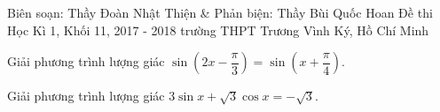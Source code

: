 \begin{name}
	{Biên soạn: Thầy Đoàn Nhật Thiện \& Phản biện: Thầy Bùi Quốc Hoan}
	{Đề thi Học Kì 1, Khối 11, 2017 - 2018 trường THPT Trương Vình Ký, Hồ Chí Minh}
\end{name}
\begin{bt}%
	Giải phương trình lượng giác $\sin \left( 2x-\dfrac{\pi}{3}\right) =\sin \left(x+\dfrac{\pi}{4}\right)$.
\end{bt}
\begin{bt}%
	Giải phương trình lượng giác $3\sin x+\sqrt{3}\cos x=-\sqrt{3}$.
\end{bt}
